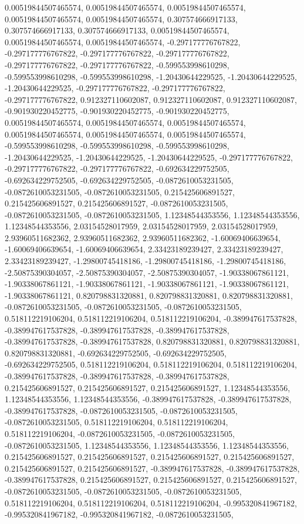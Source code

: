\documentclass[
  ,man]{apa6}
\begin{document}
0.00519844507465574, 0.00519844507465574, 0.00519844507465574, 0.00519844507465574, 0.00519844507465574, 0.307574666917133, 0.307574666917133, 0.307574666917133, 0.00519844507465574, 0.00519844507465574, 0.00519844507465574, -0.297177776767822, -0.297177776767822, -0.297177776767822, -0.297177776767822, -0.297177776767822, -0.297177776767822, -0.599553998610298, -0.599553998610298, -0.599553998610298, -1.20430644229525, -1.20430644229525, -1.20430644229525, -0.297177776767822, -0.297177776767822,
-0.297177776767822, 0.912327110602087, 0.912327110602087, 0.912327110602087, -0.901930220452775, -0.901930220452775, -0.901930220452775, 0.00519844507465574, 0.00519844507465574, 0.00519844507465574, 0.00519844507465574, 0.00519844507465574, 0.00519844507465574, -0.599553998610298, -0.599553998610298, -0.599553998610298, -1.20430644229525, -1.20430644229525, -1.20430644229525, -0.297177776767822, -0.297177776767822, -0.297177776767822, -0.692634229752505, -0.692634229752505, -0.692634229752505, -0.0872610053231505,
-0.0872610053231505, -0.0872610053231505, 0.215425606891527, 0.215425606891527, 0.215425606891527, -0.0872610053231505, -0.0872610053231505, -0.0872610053231505, 1.12348544353556, 1.12348544353556, 1.12348544353556, 2.03154528017959, 2.03154528017959, 2.03154528017959, 2.93960511682362, 2.93960511682362, 2.93960511682362, -1.60069406639654, -1.60069406639654, -1.60069406639654, 2.33423189239427, 2.33423189239427, 2.33423189239427, -1.29800745418186, -1.29800745418186, -1.29800745418186, -2.50875390304057,
-2.50875390304057, -2.50875390304057, -1.90338067861121, -1.90338067861121, -1.90338067861121, -1.90338067861121, -1.90338067861121, -1.90338067861121, 0.820798831320881, 0.820798831320881, 0.820798831320881, -0.0872610053231505, -0.0872610053231505, -0.0872610053231505, 0.518112219106204, 0.518112219106204, 0.518112219106204, -0.389947617537828, -0.389947617537828, -0.389947617537828, -0.389947617537828, -0.389947617537828, -0.389947617537828, 0.820798831320881, 0.820798831320881, 0.820798831320881,
-0.692634229752505, -0.692634229752505, -0.692634229752505, 0.518112219106204, 0.518112219106204, 0.518112219106204, -0.389947617537828, -0.389947617537828, -0.389947617537828, 0.215425606891527, 0.215425606891527, 0.215425606891527, 1.12348544353556, 1.12348544353556, 1.12348544353556, -0.389947617537828, -0.389947617537828, -0.389947617537828, -0.0872610053231505, -0.0872610053231505, -0.0872610053231505, 0.518112219106204, 0.518112219106204, 0.518112219106204, -0.0872610053231505, -0.0872610053231505,
-0.0872610053231505, 1.12348544353556, 1.12348544353556, 1.12348544353556, 0.215425606891527, 0.215425606891527, 0.215425606891527, 0.215425606891527, 0.215425606891527, 0.215425606891527, -0.389947617537828, -0.389947617537828, -0.389947617537828, 0.215425606891527, 0.215425606891527, 0.215425606891527, -0.0872610053231505, -0.0872610053231505, -0.0872610053231505, 0.518112219106204, 0.518112219106204, 0.518112219106204, -0.995320841967182, -0.995320841967182, -0.995320841967182, -0.0872610053231505,
\end{document}
